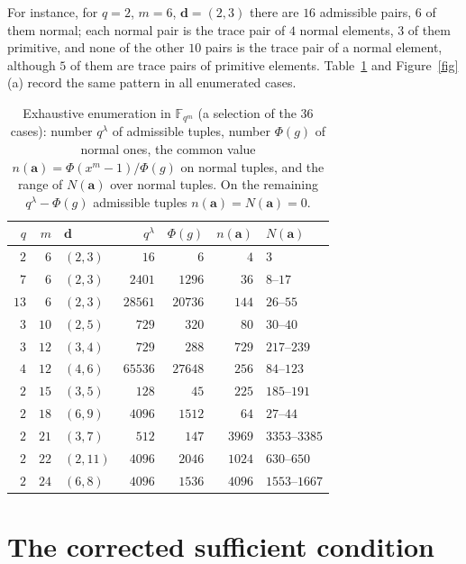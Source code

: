 \documentclass[11pt,a4paper]{amsart}
\theoremstyle{remark}
\newcommand{\F}{\mathbb{F}}
\newcommand{\bd}{\mathbf{d}}
\newcommand{\ba}{\mathbf{a}}
\begin{document}
For instance, for $q=2$, $m=6$, $\bd=(2,3)$ there are $16$ admissible pairs, $6$ of them normal; each normal
pair is the trace pair of $4$ normal elements, $3$ of them primitive, and none of the other $10$ pairs is the
trace pair of a normal element, although $5$ of them are trace pairs of primitive elements. Table~\ref{tab:ex}
and Figure~\ref{fig}(a) record the same pattern in all enumerated cases.

\begin{table}[t]
\centering\small
\begin{tabular}{@{}rrlrrrl@{}}
\toprule
$q$ & $m$ & $\bd$ & $q^{\lambda}$ & $\Phi(g)$ & $n(\ba)$ & $N(\ba)$\\
\midrule
$2$ & $6$ & $(2,3)$ & $16$ & $6$ & $4$ & $3$\\
$7$ & $6$ & $(2,3)$ & $2401$ & $1296$ & $36$ & $8$--$17$\\
$13$ & $6$ & $(2,3)$ & $28561$ & $20736$ & $144$ & $26$--$55$\\
$3$ & $10$ & $(2,5)$ & $729$ & $320$ & $80$ & $30$--$40$\\
$3$ & $12$ & $(3,4)$ & $729$ & $288$ & $729$ & $217$--$239$\\
$4$ & $12$ & $(4,6)$ & $65536$ & $27648$ & $256$ & $84$--$123$\\
$2$ & $15$ & $(3,5)$ & $128$ & $45$ & $225$ & $185$--$191$\\
$2$ & $18$ & $(6,9)$ & $4096$ & $1512$ & $64$ & $27$--$44$\\
$2$ & $21$ & $(3,7)$ & $512$ & $147$ & $3969$ & $3353$--$3385$\\
$2$ & $22$ & $(2,11)$ & $4096$ & $2046$ & $1024$ & $630$--$650$\\
$2$ & $24$ & $(6,8)$ & $4096$ & $1536$ & $4096$ & $1553$--$1667$\\
\bottomrule
\end{tabular}
\medskip
\caption{Exhaustive enumeration in $\F_{q^m}$ (a selection of the $36$ cases): number $q^{\lambda}$ of
admissible tuples, number $\Phi(g)$ of normal ones, the common value $n(\ba)=\Phi(x^m-1)/\Phi(g)$ on normal
tuples, and the range of $N(\ba)$ over normal tuples. On the remaining $q^{\lambda}-\Phi(g)$ admissible tuples
$n(\ba)=N(\ba)=0$.}\label{tab:ex}
\end{table}

\section{The corrected sufficient condition}
\end{document}
